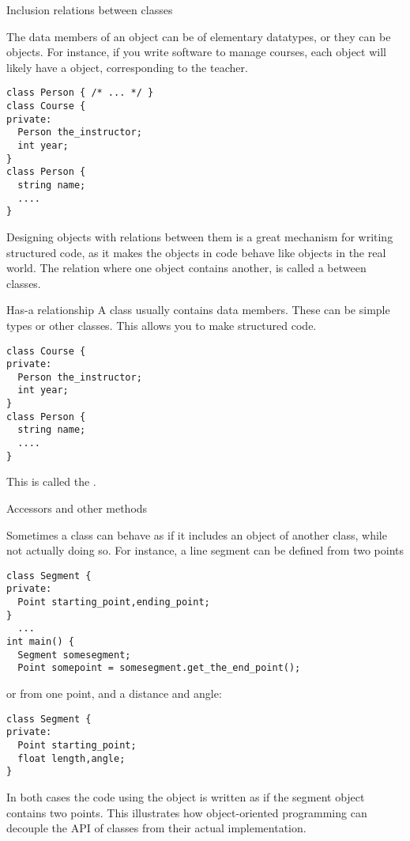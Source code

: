 
 {Inclusion relations between classes}
\label{sec:hasa}

The data members of an object can be of elementary datatypes, or they
can be objects. For instance, if you write software to manage courses,
each  object will likely have a  object,
corresponding to the teacher.
\begin{verbatim}
class Person { /* ... */ }
class Course {
private:
  Person the_instructor;
  int year;
}
class Person {
  string name;
  ....
}
\end{verbatim}

Designing objects with relations between them
is a great mechanism for writing structured code,
as it makes the objects in code behave like objects in the real world.
The relation where one object contains another, is called a
 between classes.

\begin{slide}{Has-a relationship}
  \label{sl:obj-hasa}
  A class usually contains data members. These can be simple types or
  other classes. This allows you to make structured code.
\begin{verbatim}
class Course {
private:
  Person the_instructor;
  int year;
}
class Person {
  string name;
  ....
}
\end{verbatim}
  This is
  called the .  
\end{slide}

 {Accessors and other methods}

Sometimes a class can behave as if it includes an object of another
class, while not actually doing so. For instance, a line segment can
be defined from two points
\begin{verbatim}
class Segment {
private:
  Point starting_point,ending_point;
}
  ...
int main() {
  Segment somesegment;
  Point somepoint = somesegment.get_the_end_point();
\end{verbatim}
or from one point, and a distance and angle:
\begin{verbatim}
class Segment {
private:
  Point starting_point;
  float length,angle;
}
\end{verbatim}
In both cases the code using the object is written as if the segment
object contains two points.
This illustrates how object-oriented programming can decouple the
\ac{API} of classes from their actual implementation.

